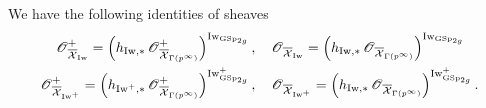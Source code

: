 \begin{Lemma}\label{Lemma: structure sheaves at the infinite level and the structure sheaves at the Iwahori level}
We have the following identities of sheaves \begin{align*}
    \scrO_{\overline{\calX}_{\Iw}}^{+}=\left(h_{\Iw, *}\scrO_{\overline{\calX}_{\Gamma(p^{\infty})}}^+\right)^{\Iw_{\GSp_{2g}}}, &  \quad \scrO_{\overline{\calX}_{\Iw}}=\left(h_{\Iw, *}\scrO_{\overline{\calX}_{\Gamma(p^{\infty})}}\right)^{\Iw_{\GSp_{2g}}}\\
    \scrO_{\overline{\calX}_{\Iw^+}}^{+}=\left(h_{\Iw^+, *}\scrO_{\overline{\calX}_{\Gamma(p^{\infty})}}^+\right)^{\Iw^+_{\GSp_{2g}}}, &  \quad \scrO_{\overline{\calX}_{\Iw^+}}=\left(h_{\Iw, *}\scrO_{\overline{\calX}_{\Gamma(p^{\infty})}}\right)^{\Iw^+_{\GSp_{2g}}}.
\end{align*}
\end{Lemma}
